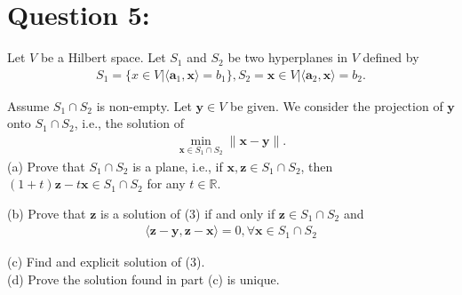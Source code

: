 \documentclass[a4paper,12pt]{article}
\newcommand{\R}{\mathbb{R}}
\begin{document}
\section*{Question 5:}
Let \(V\) be a Hilbert space. Let \(S_1\) and \(S_2\) be two hyperplanes in \(V\) defined by
\begin{align*}
    S_1 = \{x \in V | \langle \bm{a}_1, \bm{x}\rangle = b_1\}, S_2 = {\bm{x} \in V | \langle \bm{a}_2, \bm{x} \rangle = b_2}.
\end{align*}

Assume \(S_1 \cap S_2\) is non-empty. Let \(\bm{y} \in V\) be given. We consider the projection of \(\bm{y}\) onto \(S_1 \cap S_2\), i.e.,
the solution of 
\begin{align}
    \min_{\bm{x} \in S_1 \cap S_2}\|\bm{x} - \bm{y}\|.
\end{align}
(a) Prove that \(S_1 \cap S_2\) is a plane, i.e., if \(\bm{x}, \bm{z} \in S_1 \cap S_2\), then \((1 + t)\bm{z} - t\bm{x} \in S_1 \cap S_2\) for any \(t \in \R\). 

(b) Prove that \(\bm{z}\) is a solution of (3) if and only if \(\bm{z} \in S_1 \cap S_2\) and 
\begin{align}
    \langle \bm{z} - \bm{y}, \bm{z} - \bm{x}\rangle = 0, \forall \bm{x} \in S_1 \cap S_2
\end{align}

(c) Find and explicit solution of (3). \\

(d) Prove the solution found in part (c) is unique. \\
\end{document}

